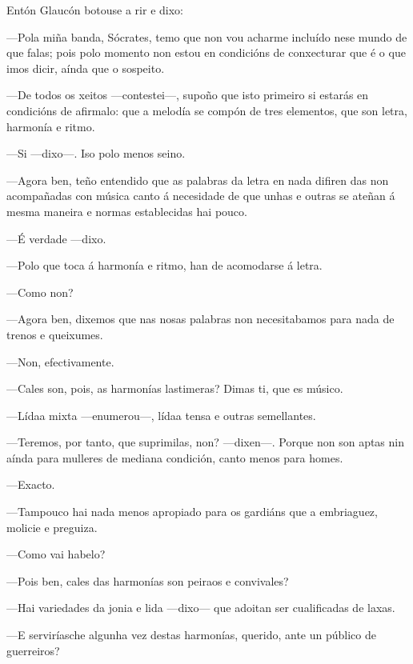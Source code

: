 \begin{multicols}{3}
\setlength{\columnseprule}{1pt}
{\small

\noindent
Entón Glaucón botouse a rir e dixo:

\noindent
---Pola miña banda, Sócrates, temo que non vou acharme incluído nese mundo de que falas; pois polo momento non estou en condicións de conxecturar que é o que imos dicir, aínda que o sospeito.

\noindent
---De todos os xeitos ---contestei---, supoño que isto primeiro si estarás en condicións de afirmalo: que a melodía se compón de tres elementos, que son letra, harmonía e ritmo.

\noindent
---Si ---dixo---. Iso polo menos seino.

\noindent
---Agora ben, teño entendido que as palabras da letra en nada difiren das non acompañadas con música canto á necesidade de que unhas e outras se ateñan á mesma maneira e normas establecidas hai pouco.

\noindent
---É verdade ---dixo.

\noindent
---Polo que toca á harmonía e ritmo, han de acomodarse á letra.

\noindent
---Como non?

\noindent
---Agora ben, dixemos que nas nosas palabras non necesitabamos para nada de trenos e queixumes.

\noindent
---Non, efectivamente.

\noindent
---Cales son, pois, as harmonías lastimeras? Dimas ti, que es músico.

\noindent
---Lídaa mixta ---enumerou---, lídaa tensa e outras semellantes.

\noindent
---Teremos, por tanto, que suprimilas, non? ---dixen---. Porque non son
aptas nin aínda para mulleres de mediana condición, canto menos para
homes.

\noindent
---Exacto.

\noindent
---Tampouco hai nada menos apropiado para os gardiáns que a embriaguez,
molicie e preguiza.

\noindent
---Como vai habelo?

\noindent
---Pois ben, cales das harmonías son peiraos e convivales?

\noindent
---Hai variedades da jonia e lida ---dixo--- que adoitan ser cualificadas de laxas.

\noindent
---E serviríasche algunha vez destas harmonías, querido, ante un público de guerreiros?

}
\end{multicols}

